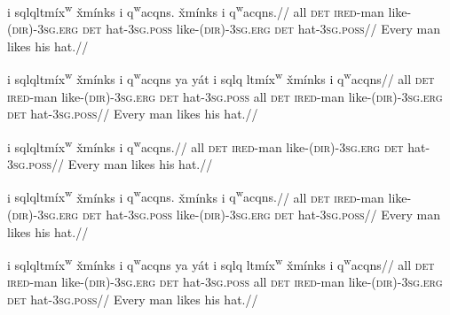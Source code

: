 \a\begingl[glhangrightskip=1]
 {i\textglotstop }
{sq\textschwa lq\textschwa ltm\'ix\textsuperscript{w}} {\v{x}m\'inks}
{i\textglotstop } {q\textsuperscript{w}acqns.} {\v{x}m\'inks}
{i\textglotstop } {q\textsuperscript{w}acqns.}//
\glb all \textsc{det} \textsc{ired}-man like-\textsc{(dir)-3sg.erg}
\textsc{det} hat-\textsc{3sg.poss} like-\textsc{(dir)-3sg.erg}
\textsc{det} hat-\textsc{3sg.poss}// \glft Every man likes his hat.//
\endgl

\a\begingl
{} {i\textglotstop }
{sq\textschwa lq\textschwa ltm\'ix\textsuperscript{w}} {\v{x}m\'inks}
{i\textglotstop } {q\textsuperscript{w}acqns} {ya\textrevglotstop
y\'a\textrevglotstop t} {i\textglotstop } {sq\textschwa lq\textschwa
ltm\'ix\textsuperscript{w}} {\v{x}m\'inks} {i\textglotstop }
{q\textsuperscript{w}acqns}//
\glb all \textsc{det} \textsc{ired}-man like-\textsc{(dir)-3sg.erg}
\textsc{det} hat-\textsc{3sg.poss} all \textsc{det} \textsc{ired}-man
like-\textsc{(dir)-3sg.erg} \textsc{det} hat-\textsc{3sg.poss}// \glft
Every man likes his hat.//
\endgl
\xe

\pex[glhangstyle=normal]
\a\begingl
{} {i\textglotstop }
{sq\textschwa lq\textschwa ltm\'ix\textsuperscript{w}} {\v{x}m\'inks}
{i\textglotstop } {q\textsuperscript{w}acqns.}//
\glb all \textsc{det} \textsc{ired}-man like-\textsc{(dir)-3sg.erg}
\textsc{det} hat-\textsc{3sg.poss}// \glft Every man likes his hat.//
\endgl

\a\begingl[glhangrightskip=1]
 {i\textglotstop }
{sq\textschwa lq\textschwa ltm\'ix\textsuperscript{w}} {\v{x}m\'inks}
{i\textglotstop } {q\textsuperscript{w}acqns.} {\v{x}m\'inks}
{i\textglotstop } {q\textsuperscript{w}acqns.}//
\glb all \textsc{det} \textsc{ired}-man like-\textsc{(dir)-3sg.erg}
\textsc{det} hat-\textsc{3sg.poss} like-\textsc{(dir)-3sg.erg}
\textsc{det} hat-\textsc{3sg.poss}// \glft Every man likes his hat.//
\endgl

\a\begingl
{} {i\textglotstop }
{sq\textschwa lq\textschwa ltm\'ix\textsuperscript{w}} {\v{x}m\'inks}
{i\textglotstop } {q\textsuperscript{w}acqns} {ya\textrevglotstop
y\'a\textrevglotstop t} {i\textglotstop } {sq\textschwa lq\textschwa
ltm\'ix\textsuperscript{w}} {\v{x}m\'inks} {i\textglotstop }
{q\textsuperscript{w}acqns}//
\glb all \textsc{det} \textsc{ired}-man like-\textsc{(dir)-3sg.erg}
\textsc{det} hat-\textsc{3sg.poss} all \textsc{det} \textsc{ired}-man
like-\textsc{(dir)-3sg.erg} \textsc{det} hat-\textsc{3sg.poss}// \glft
Every man likes his hat.//
\endgl
\xe

%
